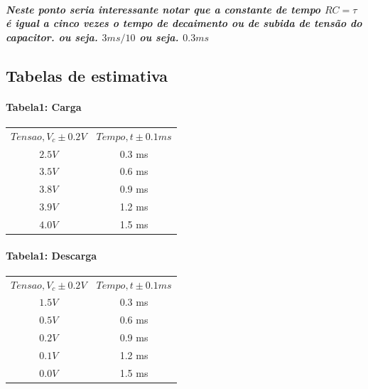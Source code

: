 \documentclass[12pt,twoside, a4paper, twocolumn]{article}
\begin{document}
\subparagraph*{Neste ponto seria interessante notar que a constante de tempo $RC = \tau$ é igual a cinco vezes o tempo de decaimento ou de subida de tensão do capacitor. ou seja. $3ms/10$ ou seja. $0.3ms$}

\clearpage

\subsection{Tabelas de estimativa}


\paragraph*{Tabela1: Carga}
\begin{center}
    \begin{tabular}{ |cc| }
        \hline
        $Tensao, V_{c} \pm 0.2V$ & $Tempo, t \pm 0.1ms$ \\
        $2.5 V$                  & 0.3 ms               \\
        $3.5 V$                  & 0.6 ms               \\
        $3.8 V$                  & 0.9 ms               \\
        $3.9 V$                  & 1.2 ms               \\
        $4.0 V$                  & 1.5 ms               \\
        \hline
    \end{tabular}
\end{center}



\paragraph*{Tabela1: Descarga}
\begin{center}
    \begin{tabular}{ |cc| }
        \hline
        $Tensao, V_{c} \pm 0.2V$ & $Tempo, t \pm 0.1ms$ \\
        $1.5 V$                  & 0.3 ms               \\
        $0.5V$                   & 0.6 ms               \\
        $0.2 V$                  & 0.9 ms               \\
        $0.1 V$                  & 1.2 ms               \\
        $0.0 V$                  & 1.5 ms               \\
        \hline
    \end{tabular}
\end{center}
\end{document}
